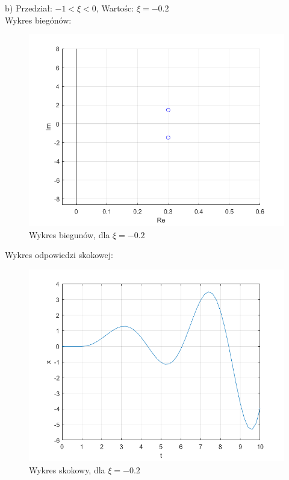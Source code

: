\documentclass{article}
\begin{document}
\begin{flushleft}
 
 
 b) Przedział: $-1<\xi<0$, Wartośc: $\xi=-0.2$\\
  Wykres biegónów:\\
 \begin{figure}[h!]
    \centering
    \includegraphics[scale=0.6]{bieguny_ksi_-0_2.png}
    \caption{Wykres biegunów, dla $\xi=-0.2$}
    \label{fig:bieguny_ksi_-0_2}
 \end{figure}
 
 
 Wykres odpowiedzi skokowej:\\
 \begin{figure}[h!]
    \centering
    \includegraphics[scale=0.6]{ksi_-0_2.png}
    \caption{Wykres skokowy, dla $\xi=-0.2$}
    \label{fig:ksi_-0_2}
 \end{figure}
 

\end{flushleft}
\end{document}
